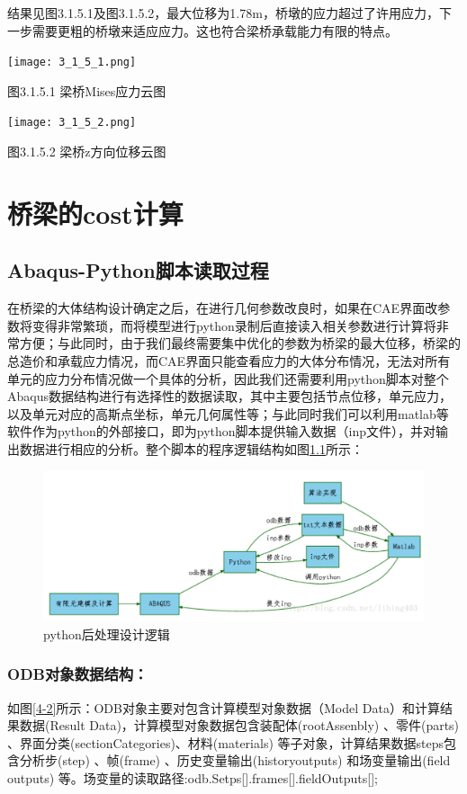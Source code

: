 \documentclass[forprint]{WHUBachelor}
\begin{document}
结果见图3.1.5.1及图3.1.5.2，最大位移为1.78m，桥墩的应力超过了许用应力，下一步需要更粗的桥墩来适应应力。这也符合梁桥承载能力有限的特点。

\texttt{[image: 3\_1\_5\_1.png]}

图3.1.5.1 梁桥Mises应力云图

\texttt{[image: 3\_1\_5\_2.png]}

图3.1.5.2 梁桥z方向位移云图

\chapter{桥梁的cost计算}

\section{Abaqus-Python脚本读取过程}
在桥梁的大体结构设计确定之后，在进行几何参数改良时，如果在CAE界面改参数将变得非常繁琐，而将模型进行python录制后直接读入相关参数进行计算将非常方便；与此同时，由于我们最终需要集中优化的参数为桥梁的最大位移，桥梁的总造价和承载应力情况，而CAE界面只能查看应力的大体分布情况，无法对所有单元的应力分布情况做一个具体的分析，因此我们还需要利用python脚本对整个Abaqus数据结构进行有选择性的数据读取，其中主要包括节点位移，单元应力，以及单元对应的高斯点坐标，单元几何属性等；与此同时我们可以利用matlab等软件作为python的外部接口，即为python脚本提供输入数据（inp文件），并对输出数据进行相应的分析。整个脚本的程序逻辑结构如图\ref{4-1}所示：

\begin{figure}[H]
\centering  
\includegraphics[width = .8\textwidth]{1.png} 
\caption{python后处理设计逻辑} 
\label{4-1} 
\end{figure}

\subsection{ODB对象数据结构：}

如图\ref{4-2}所示：ODB对象主要对包含计算模型对象数据（Model Data）和计算结果数据(Result Data)，计算模型对象数据包含装配体(rootAssenbly)
、零件(parts) 、界面分类(sectionCategories)、材料(materials) 等子对象，计算结果数据steps包含分析步(step)
、帧(frame) 、历史变量输出(historyoutputs) 和场变量输出(field outputs) 等。场变量的读取路径:odb.Setps{[}{]}.frames{[}{]}.fieldOutputs{[}{]};
\end{document}

